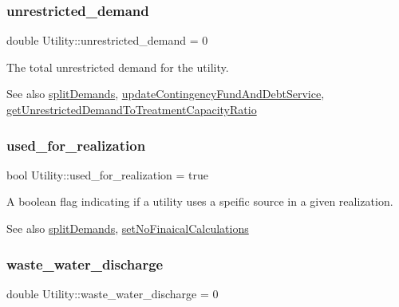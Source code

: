 \subsubsection{\texorpdfstring{unrestricted\+\_\+demand}{unrestricted\_demand}}
{\footnotesize\ttfamily double Utility\+::unrestricted\+\_\+demand = 0\hspace{0.3cm}{\ttfamily [private]}}



The total unrestricted demand for the utility. 

\begin{DoxySeeAlso}{See also}
\mbox{\hyperlink{classUtility_aca42b14087c3184d4fec10a2e8729c05}{split\+Demands}}, \mbox{\hyperlink{classUtility_ab663efd526505a3d843cae7075cc3b91}{update\+Contingency\+Fund\+And\+Debt\+Service}}, \mbox{\hyperlink{classUtility_a73afadbbcd2d1a21452937b514d10c34}{get\+Unrestricted\+Demand\+To\+Treatment\+Capacity\+Ratio}} 
\end{DoxySeeAlso}
\mbox{\label{classUtility_a4333d1e4444eeaf94acee51a7af35fb0}} 
\subsubsection{\texorpdfstring{used\+\_\+for\+\_\+realization}{used\_for\_realization}}
{\footnotesize\ttfamily bool Utility\+::used\+\_\+for\+\_\+realization = true\hspace{0.3cm}{\ttfamily [private]}}



A boolean flag indicating if a utility uses a speific source in a given realization. 

\begin{DoxySeeAlso}{See also}
\mbox{\hyperlink{classUtility_aca42b14087c3184d4fec10a2e8729c05}{split\+Demands}}, \mbox{\hyperlink{classUtility_a6a89bff2044b4f68714ce9934344e2ad}{set\+No\+Finaical\+Calculations}} 
\end{DoxySeeAlso}
\mbox{\label{classUtility_a72385ccc48ab17e14105862389a19b7a}} 
\subsubsection{\texorpdfstring{waste\+\_\+water\+\_\+discharge}{waste\_water\_discharge}}
{\footnotesize\ttfamily double Utility\+::waste\+\_\+water\+\_\+discharge = 0\hspace{0.3cm}{\ttfamily [private]}}



